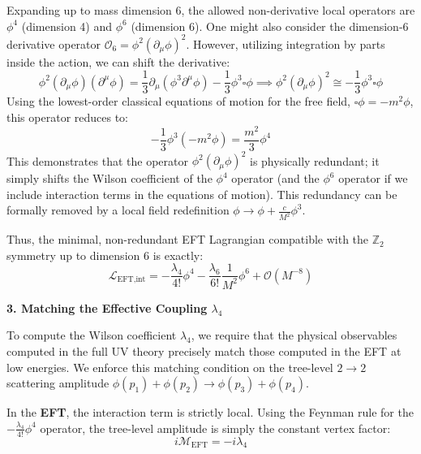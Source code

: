 Expanding up to mass dimension 6, the allowed non-derivative local operators are $\phi^4$ (dimension 4) and $\phi^6$ (dimension 6).
One might also consider the dimension-6 derivative operator $\mathcal{O}_6 = \phi^2 (\partial_\mu \phi)^2$. However, utilizing integration by parts inside the action, we can shift the derivative:
\[
    \phi^2 (\partial_\mu \phi) (\partial^\mu \phi) = \frac{1}{3} \partial_\mu (\phi^3 \partial^\mu \phi) - \frac{1}{3} \phi^3 \square \phi \implies \phi^2 (\partial_\mu \phi)^2 \cong -\frac{1}{3} \phi^3 \square \phi
\]
Using the lowest-order classical equations of motion for the free field, $\square \phi = -m^2 \phi$, this operator reduces to:
\[
    -\frac{1}{3} \phi^3 (-m^2 \phi) = \frac{m^2}{3} \phi^4
\]
This demonstrates that the operator $\phi^2 (\partial_\mu \phi)^2$ is physically redundant; it simply shifts the Wilson coefficient of the $\phi^4$ operator (and the $\phi^6$ operator if we include interaction terms in the equations of motion). This redundancy can be formally removed by a local field redefinition $\phi \to \phi + \frac{c}{M^2}\phi^3$.

Thus, the minimal, non-redundant EFT Lagrangian compatible with the $\mathbb{Z}_2$ symmetry up to dimension 6 is exactly:
\[
    \mathcal{L}_{\text{EFT,int}} = -\frac{\lambda_4}{4!} \phi^4 - \frac{\lambda_6}{6!} \frac{1}{M^2} \phi^6 + \mathcal{O}(M^{-8})
\]

\textbf{3. Matching the Effective Coupling $\lambda_4$}

To compute the Wilson coefficient $\lambda_4$, we require that the physical observables computed in the full UV theory precisely match those computed in the EFT at low energies. We enforce this matching condition on the tree-level $2 \to 2$ scattering amplitude $\phi(p_1) + \phi(p_2) \to \phi(p_3) + \phi(p_4)$.

In the \textbf{EFT}, the interaction term is strictly local. Using the Feynman rule for the $-\frac{\lambda_4}{4!}\phi^4$ operator, the tree-level amplitude is simply the constant vertex factor:
\[
    i\mathcal{M}_{\text{EFT}} = -i\lambda_4
\]

